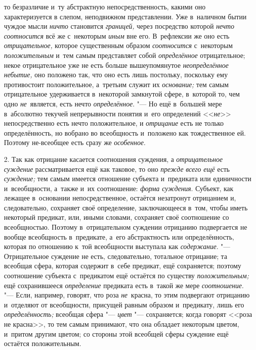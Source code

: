 то безразличие и~ту абстрактную непосредственность, какими оно характеризуется
в слепом, неподвижном представлении. Уже в~наличном бытии чуждое мысли
{\em ничто} становится {\em границей,} через посредство которой
{\em нечто соотносится} всё же с~некоторым {\em иным} вне его. В~рефлексии же
оно есть {\em отрицательное,} которое существенным образом {\em соотносится}
с~некоторым {\em положительным} и~тем самым представляет собой
{\em определённое} отрицательное; некое отрицательное уже не есть больше
вышеупомянутое {\em неопределённое небытие,} оно положено так, что оно есть
лишь постольку, поскольку ему противостоит положительное, а~третьим служит их
{\em основание;} тем самым отрицательное удерживается в~некоторой замкнутой
сфере, в~которой то, чем одно {\em не}~является, есть нечто {\em определённое}.
"--- Но ещё в~большей мере в~абсолютно текучей непрерывности понятия и~его
определений <<{\em не}>> непосредственно есть нечто
положительное, и {\em отрицание} есть не только определённость,
но вобрано во всеобщность и~положено как тождественное ей. Поэтому
не-всеобщее есть сразу же {\em особенное}.

2. Так как отрицание касается соотношения суждения, а
{\em отрицательное суждение} рассматривается ещё как таковое, то оно
{\em прежде всего ещё} есть {\em суждение;}
тем самым имеется отношение субъекта и~предиката или
единичности и~всеобщности, а~также и~их соотношение: {\em форма суждения}.
Субъект, как лежащее в~основании непосредственное, остаётся
незатронут отрицанием и, следовательно, сохраняет своё определение,
заключающееся в~том, чтобы иметь некоторый предикат, или, иными словами,
сохраняет своё соотношение со всеобщностью. Поэтому в~отрицательном
суждении отрицанию подвергается не вообще всеобщность в~предикате, а~его
абстрактность или определённость, которая по отношению к~той всеобщности
выступала как {\em содержание}. "---
Отрицательное суждение не есть, следовательно, тотальное
отрицание; та всеобщая сфера, которая содержит в~себе предикат, ещё
сохраняется; поэтому соотношение субъекта с~предикатом ещё остаётся по
существу {\em положительным;} ещё сохранившееся {\em определение}
предиката есть в~такой же мере {\em соотношение}. "--- Если, например,
говорят, что роза {\em не}~красна, то этим подвергают отрицанию и~отделяют
от всеобщности, присущей равным образом и~предикату, лишь его
{\em определённость;} всеобщая сфера "--- {\em цвет}
"--- сохраняется; когда говорят <<роза не красна>>, то тем самым
принимают, что она обладает некоторым цветом, и~притом другим цветом; со
стороны этой всеобщей сферы суждение ещё остаётся положительным.

